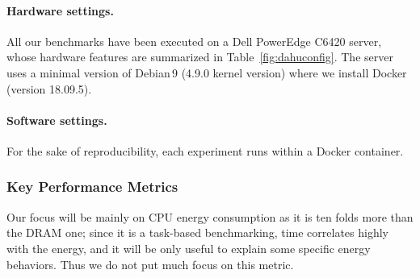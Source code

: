 \paragraph{Hardware settings.}
All our benchmarks have been executed on a Dell PowerEdge C6420 server, whose hardware features are summarized in Table~\ref{fig:dahuconfig}.
The server uses a minimal version of Debian\,9 (4.9.0 kernel version) where we install Docker (version 18.09.5).

\begin{table}[hbt]
      \caption{Benchmarking server configuration.}
      \label{fig:dahuconfig}
\end{table}

\paragraph{Software settings.}
For the sake of reproducibility, each experiment runs within a Docker container.
\subsubsection{Key Performance Metrics}
Our focus will be mainly on CPU energy consumption as it is ten folds more than the DRAM one; since it is a task-based benchmarking, time correlates highly with the energy, and it will be only useful to explain some specific energy behaviors. Thus we do not put much focus on this metric.

